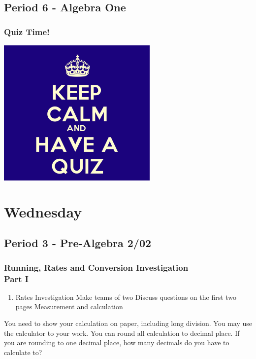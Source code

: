 \subsection[ALG1]{Period 6 - Algebra One}
   	   \begin{frame}[label=ALG1]
   	   \frametitle{Quiz Time!}   	
    
           \begin{center}
\includegraphics[width=0.7\linewidth]{Images/keep_calm_have_a_quiz}
\end{center}

   	   \end{frame}	
   	 
   	 \section[Wed]{Wednesday}
   	 \subsection[PA2/02]{Period 3 - Pre-Algebra 2/02}
      \begin{frame}[label=PA2_02]
       	\frametitle{Running, Rates and Conversion Investigation \\ Part I}   	
   	     	      	
        	\begin{enumerate}
              \item Rates Investigation 
               \rightarrowitem Make teams of two 
               \rightarrowitem Discuss questions on the first two pages 
               \rightarrowitem Measurement and calculation
             \end{enumerate}

\begin{alertblock}{}
	You need to show your calculation on paper, including long division. You may use the calculator to  your work.
	You can round all calculation to  decimal place. If you are rounding to one decimal place, how many decimals do you have to calculate to?	
\end{alertblock}    	     	      		  	     	      	
   	     	      	
      \end{frame} 	   
   	 	
